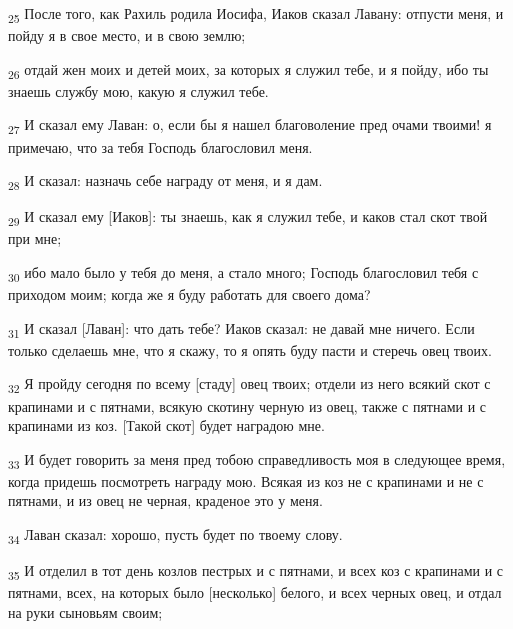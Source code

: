 \begin{tcolorbox}
\textsubscript{25} После того, как Рахиль родила Иосифа, Иаков сказал Лавану: отпусти меня, и пойду я в свое место, и в свою землю;
\end{tcolorbox}
\begin{tcolorbox}
\textsubscript{26} отдай жен моих и детей моих, за которых я служил тебе, и я пойду, ибо ты знаешь службу мою, какую я служил тебе.
\end{tcolorbox}
\begin{tcolorbox}
\textsubscript{27} И сказал ему Лаван: о, если бы я нашел благоволение пред очами твоими! я примечаю, что за тебя Господь благословил меня.
\end{tcolorbox}
\begin{tcolorbox}
\textsubscript{28} И сказал: назначь себе награду от меня, и я дам.
\end{tcolorbox}
\begin{tcolorbox}
\textsubscript{29} И сказал ему [Иаков]: ты знаешь, как я служил тебе, и каков стал скот твой при мне;
\end{tcolorbox}
\begin{tcolorbox}
\textsubscript{30} ибо мало было у тебя до меня, а стало много; Господь благословил тебя с приходом моим; когда же я буду работать для своего дома?
\end{tcolorbox}
\begin{tcolorbox}
\textsubscript{31} И сказал [Лаван]: что дать тебе? Иаков сказал: не давай мне ничего. Если только сделаешь мне, что я скажу, то я опять буду пасти и стеречь овец твоих.
\end{tcolorbox}
\begin{tcolorbox}
\textsubscript{32} Я пройду сегодня по всему [стаду] овец твоих; отдели из него всякий скот с крапинами и с пятнами, всякую скотину черную из овец, также с пятнами и с крапинами из коз. [Такой скот] будет наградою мне.
\end{tcolorbox}
\begin{tcolorbox}
\textsubscript{33} И будет говорить за меня пред тобою справедливость моя в следующее время, когда придешь посмотреть награду мою. Всякая из коз не с крапинами и не с пятнами, и из овец не черная, краденое это у меня.
\end{tcolorbox}
\begin{tcolorbox}
\textsubscript{34} Лаван сказал: хорошо, пусть будет по твоему слову.
\end{tcolorbox}
\begin{tcolorbox}
\textsubscript{35} И отделил в тот день козлов пестрых и с пятнами, и всех коз с крапинами и с пятнами, всех, на которых было [несколько] белого, и всех черных овец, и отдал на руки сыновьям своим;
\end{tcolorbox}
